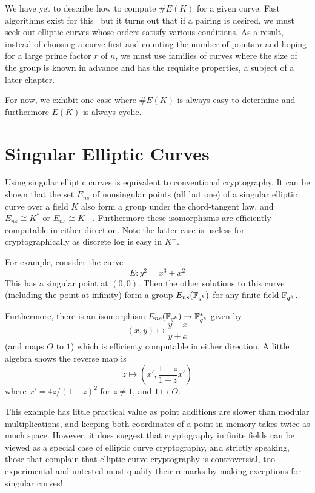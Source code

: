We have yet to describe how to compute $\#E(K)$ for a given curve.
Fast algorithms exist for this~\cite{bss}
but it turns out that if a pairing is desired, we must seek out
elliptic curves whose orders satisfy various conditions.
As a result,
instead of choosing a curve first and counting the number of points $n$ and
hoping for a large prime factor $r$ of $n$,
we must use families of curves where the size of the group
is known in advance and has the requisite properties,
a subject of a later chapter.

For now, we exhibit one case where $\#E(K)$ is always easy to determine
and furthermore $E(K)$ is always cyclic.

\section {\label{sec:singular}Singular Elliptic Curves}

Using singular elliptic curves
is equivalent to conventional cryptography.
It can be shown that the set $E_{ns}$ of nonsingular points (all but
one) of a singular elliptic curve over a field $K$
also form a group under the chord-tangent law,
and $E_{ns} \cong K^*$ or $E_{ns} \cong K^+$ \cite[Proposition 2.5]{silverman}.
Furthermore these isomorphisms are efficiently computable in either
direction.
Note the latter case is useless for cryptographically
as discrete log is easy in $K^+$.

For example, consider the curve
\[ E : y^2 = x^3 + x^2 \]
This has a singular point at $(0,0)$. Then the other solutions to
this curve (including the point at infinity) form a group
$E_{ns}(\mathbb{F}_{q^k})$ for any finite field $\mathbb{F}_{q^k}$.

Furthermore, there is an isomorphism $E_{ns}(\mathbb{F}_{q^k}) \rightarrow \mathbb{F}_{q^k}^*$
given by
\[ (x,y) \mapsto \frac{y-x}{y+x} \]
(and maps $O$ to $1$)
which is efficienty computable in either direction.
A little algebra
shows the reverse map is
\[ z \mapsto \left( x', \frac{1+z}{1-z} x' \right) \]
where $x' = 4z/(1-z)^2$ for $z \ne 1$, and $1 \mapsto O$.

This example has little practical value as point additions are slower than
modular multiplications, and keeping both coordinates of a point in memory
takes twice as much space. However, it does suggest that cryptography in finite
fields can be viewed as a special case of elliptic curve cryptography, and
strictly speaking, those that complain that elliptic curve cryptography is
controversial, too experimental and untested must qualify their remarks by
making exceptions for singular curves!

